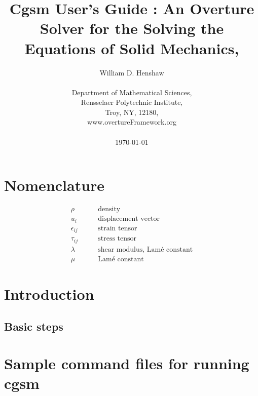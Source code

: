 \documentclass{article}
\begin{document}
 
\title{Cgsm User's Guide : An Overture Solver for the Solving the Equations of Solid Mechanics,}

\author{
William D. Henshaw  \\
\  \\
Department of Mathematical Sciences, \\
Rensselaer Polytechnic Institute, \\
Troy, NY, 12180,\\
www.overtureFramework.org \\
~~ \\
\today\\
}
 
\maketitle

\tableofcontents

\section{Nomenclature}
\begin{align}
  \rho & \qquad \mbox{density} \\
  u_i & \qquad \mbox{displacement vector} \\
  \epsilon_{ij} & \qquad \mbox{strain tensor} \\
  \tau_{ij} & \qquad \mbox{stress tensor} \\
  \lambda & \qquad \mbox{shear modulus, Lam\'e constant} \\
  \mu & \qquad \mbox{Lam\'e constant}
\end{align}

\section{Introduction}  \label{sec:intro}

\subsection{Basic steps}

\section{Sample command files for running cgsm} \label{sec:sampleCommand}
\end{document}
